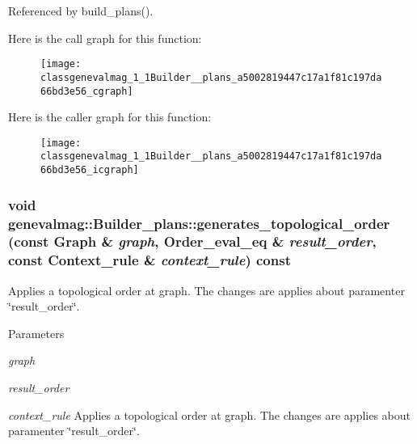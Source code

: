 Referenced by build\_\-plans().



Here is the call graph for this function:\nopagebreak
\begin{figure}[H]
\begin{center}
\leavevmode
\texttt{[image: classgenevalmag\_1\_1Builder\_\_plans\_a5002819447c17a1f81c197da66bd3e56\_cgraph]}
\end{center}
\end{figure}




Here is the caller graph for this function:\nopagebreak
\begin{figure}[H]
\begin{center}
\leavevmode
\texttt{[image: classgenevalmag\_1\_1Builder\_\_plans\_a5002819447c17a1f81c197da66bd3e56\_icgraph]}
\end{center}
\end{figure}


\hypertarget{classgenevalmag_1_1Builder__plans_a9293c2318f2a323616fc49505a44e4e3}{
\subsubsection[{generates\_\-topological\_\-order}]{\setlength{\rightskip}{0pt plus 5cm}void genevalmag::Builder\_\-plans::generates\_\-topological\_\-order (const {\bf Graph} \& {\em graph}, \/  {\bf Order\_\-eval\_\-eq} \& {\em result\_\-order}, \/  const {\bf Context\_\-rule} \& {\em context\_\-rule}) const}}
\label{classgenevalmag_1_1Builder__plans_a9293c2318f2a323616fc49505a44e4e3}
Applies a topological order at graph. The changes are applies about paramenter \char`\"{}result\_\-order\char`\"{}. 
\begin{DoxyParams}{Parameters}
\item[{\em graph}]\item[{\em result\_\-order}]\item[{\em context\_\-rule}]Applies a topological order at graph. The changes are applies about paramenter \char`\"{}result\_\-order\char`\"{}. \end{DoxyParams}



